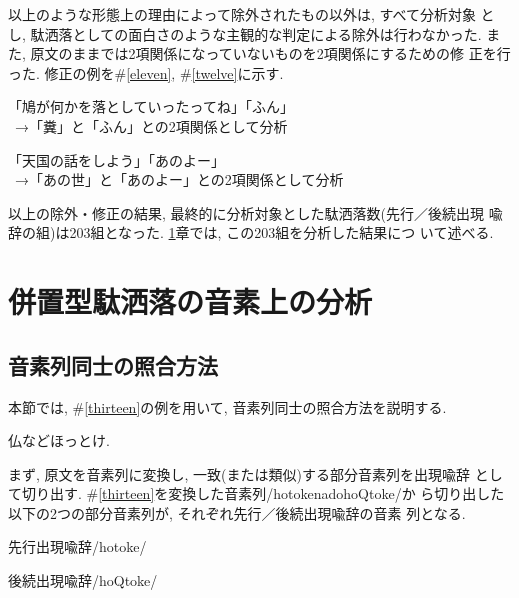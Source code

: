 以上のような形態上の理由によって除外されたもの以外は, すべて分析対象
とし, 駄洒落としての面白さのような主観的な判定による除外は行わなかった. 
また, 原文のままでは2項関係になっていないものを2項関係にするための修
正を行った. 修正の例を\#\ref{eleven}, \#\ref{twelve}に示す.  

\vspace*{1em}\begin{sample}
\item 「鳩が何かを落としていったってね」「ふん」\\
\ \hspace*{3cm}→「糞」と「ふん」との2項関係として分析 \label{eleven}
\item 「天国の話をしよう」「あのよー」\\
\ \hspace*{3cm}→「あの世」と「あのよー」との2項関係として分析 \label{twelve}
\end{sample}\vspace*{1em}
以上の除外・修正の結果, 最終的に分析対象とした駄洒落数(先行／後続出現
喩辞の組)は203組となった. \ref{onso}章では, この203組を分析した結果につ
いて述べる.  

\section{併置型駄洒落の音素上の分析}\label{onso}

\subsection{音素列同士の照合方法}

本節では, \#\ref{thirteen}の例を用いて, 音素列同士の照合方法を説明する. 

\vspace*{1em}\begin{sample}
\item 仏などほっとけ. \label{thirteen}
\end{sample}\vspace*{1em}

まず, 原文を音素列に変換し, 一致(または類似)する部分音素列を出現喩辞
として切り出す. \#\ref{thirteen}を変換した音素列/hotokenadohoQtoke/か
ら切り出した以下の2つの部分音素列が, それぞれ先行／後続出現喩辞の音素
列となる. 
 
\vspace*{1em}\begin{list}{}{}
\item 先行出現喩辞\hspace*{2cm}/hotoke/
\item 後続出現喩辞\hspace*{2cm}/hoQtoke/
\end{list}\vspace*{1em}

